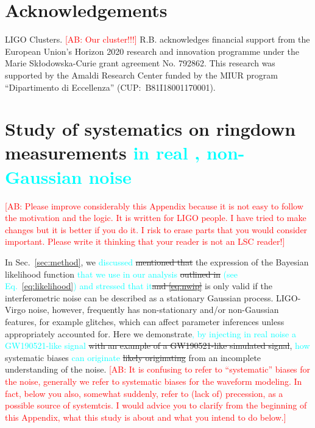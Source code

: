 \documentclass[twocolumn,prd,aps,superscriptaddress,preprintnumbers,tightenlines,showpacs,nofootinbib,eqsecnum,amsfonts,amsmath]{revtex4-1}
\newcommand{\ab}[1]{\textcolor{cyan}{#1}}
\newcommand{\comment}[1]{\textcolor{red}{[#1]}}
\begin{document}
\section*{Acknowledgements}
\label{sec:acknowledgements}
LIGO Clusters. \comment{AB: Our cluster!!!}
R.B. acknowledges financial support from the European Union's Horizon 2020 research and innovation programme under the Marie Sk\l odowska-Curie grant agreement No. 792862. This research was supported by the Amaldi Research Center funded by the MIUR program ``Dipartimento di Eccellenza'' (CUP:~B81I18001170001).

\appendix

\section{Study of systematics on ringdown measurements \ab{in real , non-Gaussian noise}}\label{sec:noise_systematics}

\comment{AB: Please improve considerably this Appendix because it is not easy to follow the motivation and the logic. It is written for LIGO people. 
I have tried to make changes but it is better if you do it. I risk to erase parts that you would consider important. Please write it thinking that your 
reader is not an LSC reader!}

In Sec.~\ref{sec:method}, we \ab{discussed} \sout{mentioned that} the expression of the
Bayesian likelihood function \ab{that we use in our analysis} \sout{outlined in} \ab{(see 
Eq.~\ref{eq:likelihood})} \ab{and stressed that it}\sout{and \ref{eq:nwip}} is only valid if the interferometric noise can be
described as a stationary Gaussian process. LIGO-Virgo noise, however,
frequently has non-stationary and/or non-Gaussian features, for
example glitches, which can affect parameter inferences unless
appropriately accounted for. Here we demonstrate\ab{, by injecting in real 
noise a GW190521-like signal} \sout{with an example of a
GW190521-like simulated signal}, \ab{how} systematic biases \ab{can originate} \sout{likely originating}
from an incomplete understanding of the noise. \comment{AB: It is confusing to refer to ``systematic'' 
biases for the noise, generally we refer to systematic biases for the waveform modeling. 
In fact, below you also, somewhat suddenly, refer to (lack of) precession, as a possible source of systemtcis. 
I would advice you to clarify from the beginning of this Appendix, what this study is about and what you intend to 
do below.}
\end{document}
